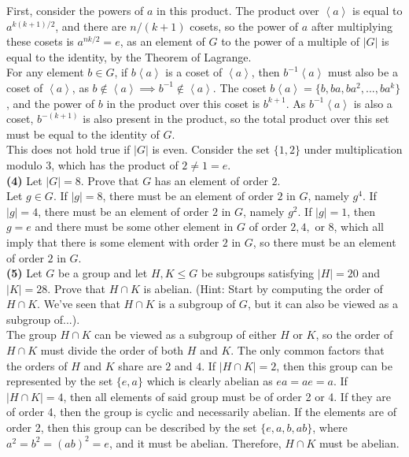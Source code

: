 \documentclass[12pt,letterpaper]{article}
\begin{document}
First, consider the powers of \(a\) in this product. The product over \(\left<a\right>\) is equal to \(a^{k(k+1)/2}\), and there are \(n/(k+1)\) cosets, so the power of \(a\) after multiplying these cosets is \(a^{nk/2} = e\), as an element of \(G\) to the power of a multiple of \(|G|\) is equal to the identity, by the Theorem of Lagrange. \\

For any element \(b \in G\), if \(b\left<a\right>\) is a coset of \(\left<a\right>\), then \(b^{-1}\left<a\right>\) must also be a coset of \(\left<a\right>\), as \(b\notin \left<a\right>\implies b^{-1} \notin \left<a\right>\). The coset \(b\left<a\right> = \{b, ba, ba^{2}, ..., ba^{k}\}\), and the power of \(b\) in the product over this coset is \(b^{k+1}\). As \(b^{-1}\left<a\right>\) is also a coset, \(b^{-(k+1)}\) is also present in the product, so the total product over this set must be equal to the identity of \(G\). \\

This does not hold true if \(|G|\) is even. Consider the set \(\{1,2\}\) under multiplication modulo 3, which has the product of \(2 \neq 1 = e\). \\ 

\textbf{(4)} Let \(|G| = 8\). Prove that \(G\) has an element of order \(2\). \\

Let \(g \in G\). If \(|g| = 8\), there must be an element of order \(2\) in \(G\), namely \(g^{4}\). If \(|g| = 4\), there must be an element of order \(2\) in \(G\), namely \(g^{2}\). If \(|g| = 1\), then \(g = e\) and there must be some other element in \(G\) of order \(2, 4,\) or \(8\), which all imply that there is some element with order \(2\) in \(G\), so there must be an element of order \(2\) in \(G\). \\

\textbf{(5)} Let \(G\) be a group and let \(H, K \leq G\) be subgroups satisfying \(|H| = 20\) and \(|K| = 28\). Prove that \(H \cap K\) is abelian. (Hint: Start by computing the order of \(H \cap K\). We've seen that \(H \cap K\) is a subgroup of \(G\), but it can also be viewed as a subgroup of...). \\

The group \(H\cap K\) can be viewed as a subgroup of either \(H\) or \(K\), so the order of \(H \cap K\) must divide the order of both \(H\) and \(K\). The only common factors that the orders of \(H\) and \(K\) share are \(2\) and \(4\). If \(|H \cap K| = 2\), then this group can be represented by the set \(\{e,a\}\) which is clearly abelian as \(ea = ae = a\). If \(|H \cap K| = 4\), then all elements of said group must be of order 2 or 4. If they are of order 4, then the group is cyclic and necessarily abelian. If the elements are of order 2, then this group can be described by the set \(\{e,a,b,ab\}\), where \(a^{2} = b^{2} = (ab)^{2} = e\), and it must be abelian. Therefore, \(H \cap K\) must be abelian. \\
\end{document}
